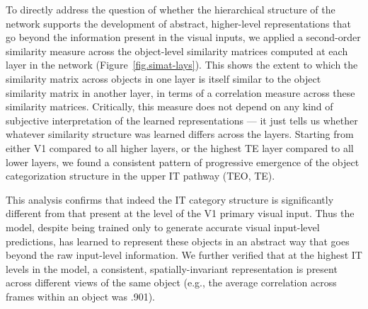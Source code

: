 \documentclass[11pt,twoside]{article}
\newif\myifpdf
\begin{document}
To directly address the question of whether the hierarchical structure of the network supports the development of abstract, higher-level representations that go beyond the information present in the visual inputs, we applied a second-order similarity measure across the object-level similarity matrices computed at each layer in the network (Figure~\ref{fig.simat-lays}).  This shows the extent to which the similarity matrix across objects in one layer is itself similar to the object similarity matrix in another layer, in terms of a correlation measure across these similarity matrices.  Critically, this measure does not depend on any kind of subjective interpretation of the learned representations --- it just tells us whether whatever similarity structure was learned differs across the layers.  Starting from either V1 compared to all higher layers, or the highest TE layer compared to all lower layers, we found a consistent pattern of progressive emergence of the object categorization structure in the upper IT pathway (TEO, TE).

This analysis confirms that indeed the IT category structure is significantly different from that present at the level of the V1 primary visual input.  Thus the model, despite being trained only to generate accurate visual input-level predictions, has learned to represent these objects in an abstract way that goes beyond the raw input-level information.  We further verified that at the highest IT levels in the model, a consistent, spatially-invariant representation is present across different views of the same object (e.g., the average correlation across frames within an object was .901).
\end{document}
